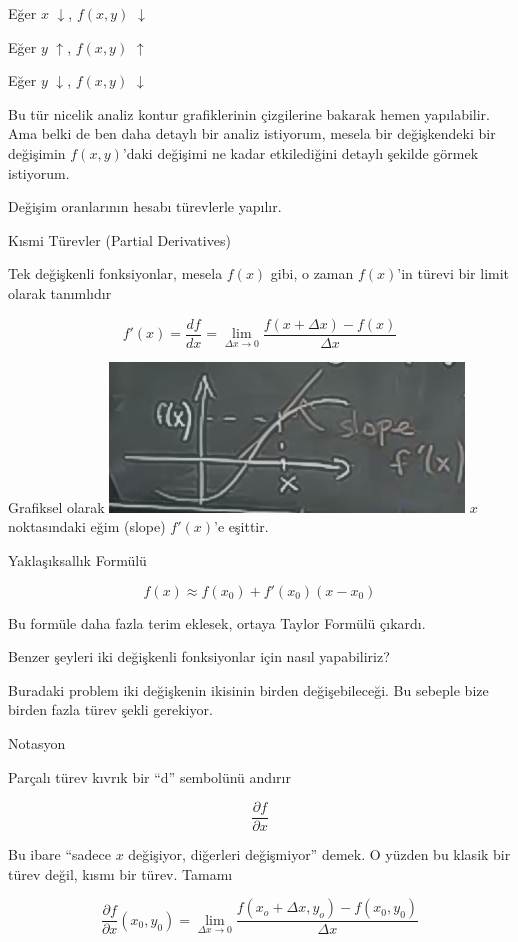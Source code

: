 \documentclass[12pt,fleqn]{article}\usepackage{../../common}
\begin{document}
Eğer $x$ $\downarrow$, $f(x,y)$ $\downarrow$

Eğer $y$ $\uparrow$, $f(x,y)$ $\uparrow$

Eğer $y$ $\downarrow$, $f(x,y)$ $\downarrow$

Bu tür nicelik analiz kontur grafiklerinin çizgilerine bakarak hemen
yapılabilir. Ama belki de ben daha detaylı bir analiz istiyorum, mesela bir
değişkendeki bir değişimin $f(x,y)$'daki değişimi ne kadar etkilediğini detaylı
şekilde görmek istiyorum.

Değişim oranlarının hesabı türevlerle yapılır. 

Kısmi Türevler (Partial Derivatives)

Tek değişkenli fonksiyonlar, mesela $f(x)$ gibi, o zaman $f(x)$'in türevi
bir limit olarak tanımlıdır

$$ f'(x) = \frac{df}{dx}  = 
\lim_{\Delta x \to 0} \frac{f(x+\Delta x) - f(x)}{\Delta x}
$$

Grafiksel olarak
\includegraphics[height=4cm]{8_15.png}
$x$ noktasındaki eğim (slope) $f'(x)$'e eşittir. 

Yaklaşıksallık Formülü

$$ f(x) \approx f(x_0) + f'(x_0)(x-x_0) $$

Bu formüle daha fazla terim eklesek, ortaya Taylor Formülü çıkardı. 

Benzer şeyleri iki değişkenli fonksiyonlar için nasıl yapabiliriz?

Buradaki problem iki değişkenin ikisinin birden değişebileceği. Bu sebeple
bize birden fazla türev şekli gerekiyor. 

Notasyon

Parçalı türev kıvrık bir ``d'' sembolünü andırır

$$ \frac{\partial f}{\partial x} $$

Bu ibare ``sadece $x$ değişiyor, diğerleri değişmiyor'' demek. O yüzden bu
klasik bir türev değil, kısmı bir türev. Tamamı

$$ \frac{\partial f}{\partial x}(x_0,y_0) = 
\lim_{\Delta x \to 0} \frac{f(x_o+\Delta x, y_o) - f(x_0,y_0)}{\Delta x}
$$
\end{document}
